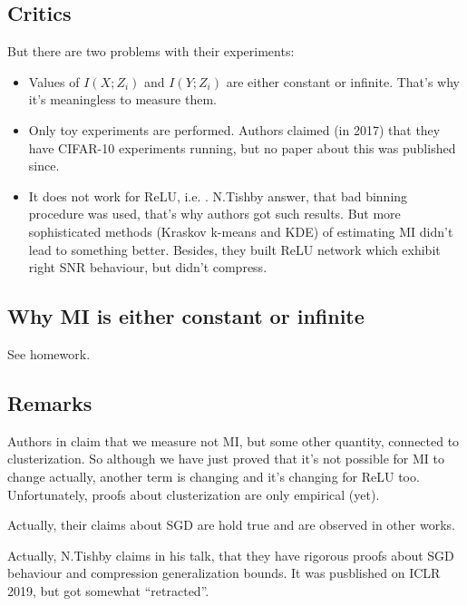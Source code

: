 \documentclass{article}
\begin{document}
\subsection{Critics}
But there are two problems with their experiments:
\begin{itemize}
    \item Values of $I(X;Z_i)$ and $I(Y;Z_i)$ are either constant or infinite. That's why it's meaningless to measure them.
    \item Only toy experiments are performed. Authors claimed (in 2017) that they have CIFAR-10 experiments running, but no paper about this was published since.
    \item It does not work for ReLU, i.e. \cite{DL_and_IB_critics}. N.Tishby answer, that bad binning procedure was used, that's why authors got such results. But more sophisticated methods (Kraskov k-means and KDE) of estimating MI didn't lead to something better. Besides, they built ReLU network which exhibit right SNR behaviour, but didn't compress. 
\end{itemize}

\subsection{Why MI is either constant or infinite}
See homework.

\subsection{Remarks}
\begin{remark}
Authors in \cite{Estimating_MI_in_NNs} claim that we measure not MI, but some other quantity, connected to clusterization.
So although we have just proved that it's not possible for MI to change actually, another term is changing and it's changing for ReLU too.
Unfortunately, proofs about clusterization are only empirical (yet).
\end{remark}

\begin{remark}
Actually, their claims about SGD are hold true and are observed in other works.
\end{remark}

\begin{remark}
Actually, N.Tishby claims in his talk, that they have rigorous proofs about SGD behaviour and compression generalization bounds.
It was pusblished on ICLR 2019, but got somewhat ``retracted''.
\end{remark}
\end{document}
